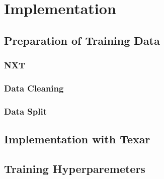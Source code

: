 \chapter{Implementation}\label{ch:implementation}

\Blindtext


\section{Preparation of Training Data}

\Blindtext

\subsection{NXT}

\Blindtext

\subsection{Data Cleaning}

\Blindtext

\subsection{Data Split}

\Blindtext


\section{Implementation with Texar}

\Blindtext


\section{Training Hyperparemeters}

\Blindtext